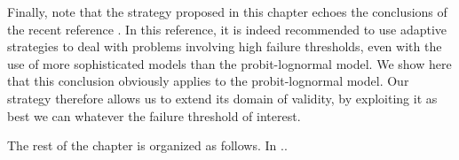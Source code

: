 













{Finally, note that the strategy proposed in this chapter echoes the conclusions of the recent reference \cite{zhu_seismic_2023}. In this reference, it is indeed recommended to use adaptive strategies to deal with problems involving high failure thresholds, even with the use of more sophisticated models than the probit-lognormal model. We show here that this conclusion obviously applies to the probit-lognormal model. Our strategy therefore allows us to extend its domain of validity, by exploiting it as best we can whatever the failure threshold of interest.}



The rest of the chapter is organized as follows. In ..




